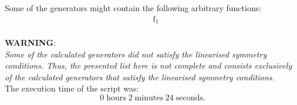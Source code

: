 \noindent Some of the generators might contain the following arbitrary functions:
\begin{align*}
&\operatorname{f_{1}}\\
\end{align*}

\noindent\huge\textbf{WARNING}:\\
\noindent\Large\textit{Some of the calculated generators did not satisfy the linearised symmetry conditions. Thus, the presented list here is not complete and consists exclusively of the calculated generators that satisfy the linearised symmetry conditions.}\normalsize\\[2cm]
\noindent The execution time of the script was:
$$0\;\mathrm{hours}\;2\;\mathrm{minutes}\;24 \;\mathrm{seconds}.$$
